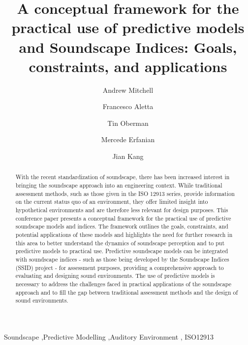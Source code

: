 \documentclass[
  authoryear,
  preprint,
  1p]{elsarticle}
\begin{document}
\begin{frontmatter}
\title{A conceptual framework for the practical use of predictive models
and Soundscape Indices: Goals, constraints, and applications}
\author[1]{Andrew Mitchell%
%
}
\author[1]{Francesco Aletta%
%
}
\author[1]{Tin Oberman%
%
}
\author[1]{Mercede Erfanian%
%
}
\author[1]{Jian Kang%
%
}







        
\begin{abstract}
With the recent standardization of soundscape, there has been increased
interest in bringing the soundscape approach into an engineering
context. While traditional assessment methods, such as those given in
the ISO 12913 series, provide information on the current status quo of
an environment, they offer limited insight into hypothetical
environments and are therefore less relevant for design purposes. This
conference paper presents a conceptual framework for the practical use
of predictive soundscape models and indices. The framework outlines the
goals, constraints, and potential applications of these models and
highlights the need for further research in this area to better
understand the dynamics of soundscape perception and to put predictive
models to practical use. Predictive soundscape models can be integrated
with soundscape indices - such as those being developed by the
Soundscape Indices (SSID) project - for assessment purposes, providing a
comprehensive approach to evaluating and designing sound environments.
The use of predictive models is necessary to address the challenges
faced in practical applications of the soundscape approach and to fill
the gap between traditional assessment methods and the design of sound
environments.
\end{abstract}





\begin{keyword}
    Soundscape \sep Predictive Modelling \sep Auditory Environment \sep 
    ISO12913
\end{keyword}
\end{frontmatter}
    
\end{document}
